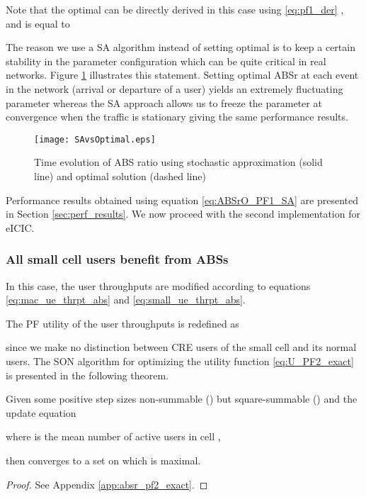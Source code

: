 \documentclass[conference]{IEEEtran}
\begin{document}
	Note that the optimal  can be directly derived in this case using \eqref{eq:pf1_der} \cite[Eq. 8]{vasudevandynamic}, and is equal to

	
	
	The reason we use a \ac{SA} algorithm instead of setting optimal  is to keep a certain stability in the parameter configuration which can be quite critical in real networks. Figure \ref{fig:theta_saVSopt} illustrates this statement. Setting optimal \ac{ABSr} at each event in the network (arrival or departure of a user) yields an extremely fluctuating parameter whereas the \ac{SA} approach allows us to freeze the parameter at convergence when the traffic is stationary giving the same performance results.

\begin{figure}[!ht]
\centering
\texttt{[image: SAvsOptimal.eps]}
\caption{Time evolution of ABS ratio using stochastic approximation (solid line) and optimal solution (dashed line)}
\label{fig:theta_saVSopt}
\end{figure}

Performance results obtained using equation \eqref{eq:ABSrO_PF1_SA} are presented in Section \ref{sec:perf_results}. We now proceed with the second implementation for \ac{eICIC}.
	

\subsubsection{All small cell users benefit from \acp{ABS}}
	In this case, the user throughputs are modified according to equations \eqref{eq:mac_ue_thrpt_abs} and \eqref{eq:small_ue_thrpt_abs}.
	
The \ac{PF} utility of the user throughputs is redefined as
	
 since we make no distinction between \ac{CRE} users of the small cell and its normal users. The \ac{SON} algorithm for optimizing the utility function \eqref{eq:U_PF2_exact} is presented in the following theorem.
	
\begin{theorem} \label{th:absr_pf2_exact}
Given some positive step sizes  non-summable () but square-summable () and the update equation
	
	where  is the mean number of active users in cell ,
	
	then  converges to a set on which  is maximal.
\end{theorem}
\begin{proof}
	See Appendix \ref{app:absr_pf2_exact}.
\end{proof}
	
\end{document}
